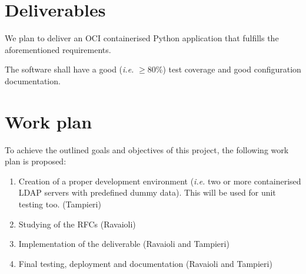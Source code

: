 \documentclass[a4paper,12pt]{article}
\begin{document}
    \section{Deliverables}
    \par We plan to deliver an OCI containerised Python application that fulfills the aforementioned
    requirements.
    \par The software shall have a good (\emph{i.e.} $\geq80\%$) test coverage and good configuration
    documentation.
    \section{Work plan}
        \par To achieve the outlined goals and objectives of this project, the following work plan is proposed:
        \begin{enumerate}
            \item Creation of a proper development environment (\emph{i.e.} two or more containerised
            LDAP servers with predefined dummy data). This will be used for unit testing too. (Tampieri)
            \item Studying of the RFCs (Ravaioli)
            \item Implementation of the deliverable (Ravaioli and Tampieri)
            \item Final testing, deployment and documentation (Ravaioli and Tampieri)
        \end{enumerate}
\end{document}
